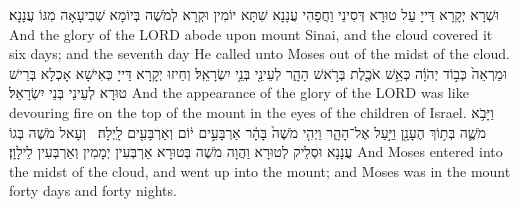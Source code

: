 {{וּשְׁרָא יְקָרָא דַּייָ עַל טוּרָא דְּסִינַי וַחֲפָהִי עֲנָנָא שִׁתָּא יוֹמִין וּקְרָא לְמֹשֶׁה בְּיוֹמָא שְׁבִיעָאָה מִגּוֹ עֲנָנָא׃}
{And the glory of the LORD abode upon mount Sinai, and the cloud covered it six days; and the seventh day He called unto Moses out of the midst of the cloud.}{}
{וּמַרְאֵה֙ כְּב֣וֹד יְהֹוָ֔ה כְּאֵ֥שׁ אֹכֶ֖לֶת בְּרֹ֣אשׁ הָהָ֑ר לְעֵינֵ֖י בְּנֵ֥י יִשְׂרָאֵֽל׃}
{וְחֵיזוּ יְקָרָא דַּייָ כְּאִישָׁא אָכְלָא בְּרֵישׁ טוּרָא לְעֵינֵי בְּנֵי יִשְׂרָאֵל׃}
{And the appearance of the glory of the LORD was like devouring fire on the top of the mount in the eyes of the children of Israel.}{}
{וַיָּבֹ֥א מֹשֶׁ֛ה בְּת֥וֹךְ הֶעָנָ֖ן וַיַּ֣עַל אֶל־הָהָ֑ר וַיְהִ֤י מֹשֶׁה֙ בָּהָ֔ר אַרְבָּעִ֣ים י֔וֹם וְאַרְבָּעִ֖ים לָֽיְלָה׃ \petucha 
{}}
{וְעָאל מֹשֶׁה בְּגוֹ עֲנָנָא וּסְלֵיק לְטוּרָא וַהֲוָה מֹשֶׁה בְּטוּרָא אַרְבְּעִין יְמָמִין וְאַרְבְּעִין לֵילָוָן׃}
{And Moses entered into the midst of the cloud, and went up into the mount; and Moses was in the mount forty days and forty nights.}{}
\newperek
}
